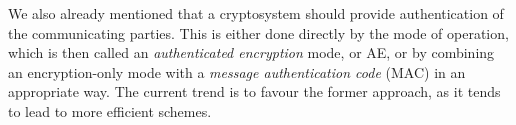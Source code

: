 We also already mentioned that a cryptosystem should provide authentication of the communicating parties. This is either done directly by the mode of operation,
which is then
called an \emph{authenticated encryption} mode, or AE, or by combining an encryption-only mode with a \emph{message authentication code} (MAC) in an appropriate way. The current
trend is to favour the former approach, as it tends to lead to more efficient schemes.

